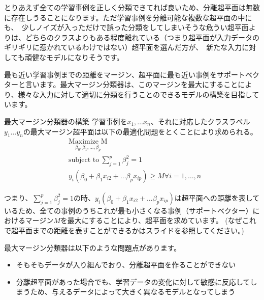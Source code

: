 \documentclass[uplatex]{jsarticle}
\begin{document}
とりあえず全ての学習事例を正しく分類できてれば良いため、分離超平面は無数に存在しうることになります。ただ学習事例を分離可能な複数な超平面の中にも、\
少しノイズが入っただけで誤った分類をしてしまいそうな危うい超平面よりは、どちらのクラスよりもある程度離れている（つまり超平面が入力データのギリギリに惹かれているわけではない）超平面を選んだ方が、\
新たな入力に対しても頑健なモデルになりそうです。

最も近い学習事例までの距離をマージン、超平面に最も近い事例をサポートベクターと言います。最大マージン分類器は、このマージンを最大にすることにより、様々な入力に対して適切に分類を行うことのできるモデルの構築を目指しています。
\begin{itembox}[l]{最大マージン分類器の構築}
  学習事例を$x_1, \ldots x_n$、それに対応したクラスラベル$y_1 \ldots y_n$の最大マージン超平面は以下の最適化問題をとくことにより求められる。
  \begin{equation*}
    \begin{aligned}
    & \underset{\beta_0, \beta_1, \ldots , \beta_p}{\text{Maximize\ M}} \\
    & \text{subject to}\  \sum_{j=1}^p \beta_j^2 = 1 \\
    & y_i(\beta_0 + \beta_1x_{i2} + \ldots \beta_px_{ip}) \geq M \forall i = 1, \dots, n
    \end{aligned}
  \end{equation*}
\end{itembox}
つまり、$\sum_{j=1}^p \beta_j^2 = 1$の時、$y_i(\beta_0 + \beta_1x_{i2} + \ldots \beta_px_{ip})$は超平面への距離を表しているため、全ての事例のうちこれが最も小さくなる事例（サポートベクター）におけるマージン$M$を最大にすることにより、超平面を求めています。
(なぜこれで超平面までの距離を表すことができるかはスライドを参照してください。)

最大マージン分類器は以下のような問題点があります。
\begin{itemize}
  \item そもそもデータが入り組んでおり、分離超平面を作ることができない\
  \item 分離超平面があった場合でも、学習データの変化に対して敏感に反応してしまうため、与えるデータによって大きく異なるモデルとなってしまう
\end{itemize}
\end{document}
